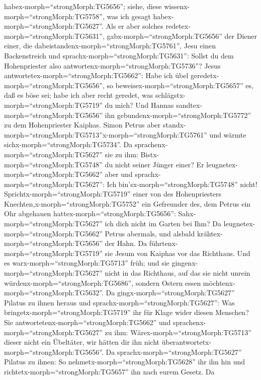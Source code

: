 habex-morph=``strongMorph:TG5656''; siehe, diese
wissenx-morph=``strongMorph:TG5758'', was ich gesagt
habex-morph=``strongMorph:TG5627''.  Als er aber solches
redetex-morph=``strongMorph:TG5631'', gabx-morph=``strongMorph:TG5656''
der Diener einer, die dabeistandenx-morph=``strongMorph:TG5761'', Jesu
einen Backenstreich und sprachx-morph=``strongMorph:TG5631'': Sollst du
dem Hohenpriester also antwortenx-morph=``strongMorph:TG5736''?
 Jesus antwortetex-morph=``strongMorph:TG5662'': Habe ich
übel geredetx-morph=``strongMorph:TG5656'', so
beweisex-morph=``strongMorph:TG5657'' es, daß es böse sei; habe ich aber
recht geredet, was schlägstx-morph=``strongMorph:TG5719'' du mich?
 Und Hannas sandtex-morph=``strongMorph:TG5656'' ihn
gebundenx-morph=``strongMorph:TG5772'' zu dem Hohenpriester Kaiphas.
 Simon Petrus aber
standx-morph=``strongMorph:TG5713''x-morph=``strongMorph:TG5761'' und
wärmte sichx-morph=``strongMorph:TG5734''. Da
sprachenx-morph=``strongMorph:TG5627'' sie zu ihm:
Bistx-morph=``strongMorph:TG5748'' du nicht seiner Jünger einer? Er
leugnetex-morph=``strongMorph:TG5662'' aber und
sprachx-morph=``strongMorph:TG5627'': Ich
bin'sx-morph=``strongMorph:TG5748'' nicht! 
Sprichtx-morph=``strongMorph:TG5719'' einer von des Hohenpriesters
Knechten,x-morph=``strongMorph:TG5752'' ein Gefreunder des, dem Petrus
ein Ohr abgehauen hattex-morph=``strongMorph:TG5656'':
Sahx-morph=``strongMorph:TG5627'' ich dich nicht im Garten bei Ihm?
 Da leugnetex-morph=``strongMorph:TG5662'' Petrus abermals,
und alsbald krähtex-morph=``strongMorph:TG5656'' der Hahn. 
Da führtenx-morph=``strongMorph:TG5719'' sie Jesum von Kaiphas vor das
Richthaus. Und es warx-morph=``strongMorph:TG5713'' früh; und sie
gingenx-morph=``strongMorph:TG5627'' nicht in das Richthaus, auf das sie
nicht unrein würdenx-morph=``strongMorph:TG5686'', sondern Ostern essen
möchtenx-morph=``strongMorph:TG5632''.  Da
gingx-morph=``strongMorph:TG5627'' Pilatus zu ihnen heraus und
sprachx-morph=``strongMorph:TG5627'': Was
bringetx-morph=``strongMorph:TG5719'' ihr für Klage wider diesen
Menschen?  Sie antwortetenx-morph=``strongMorph:TG5662''
und sprachenx-morph=``strongMorph:TG5627'' zu ihm:
Wärex-morph=``strongMorph:TG5713'' dieser nicht ein Übeltäter, wir
hätten dir ihn nicht überantwortetx-morph=``strongMorph:TG5656''.
 Da sprachx-morph=``strongMorph:TG5627'' Pilatus zu ihnen:
So nehmetx-morph=``strongMorph:TG5628'' ihr ihn hin und
richtetx-morph=``strongMorph:TG5657'' ihn nach eurem Gesetz. Da
